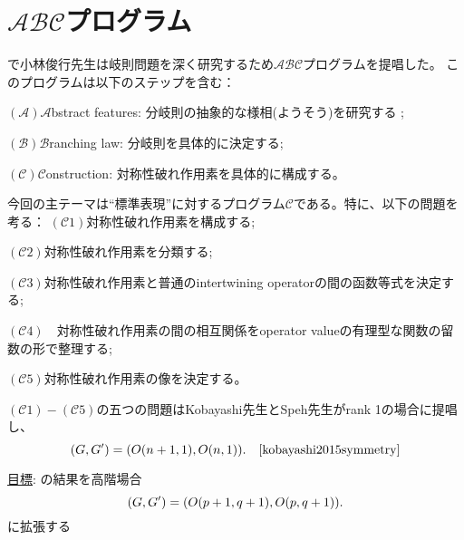 \documentclass[notes,notheorems]{beamer}
\theoremstyle{definition}
\theoremstyle{example}
\theoremstyle{remark}
\theoremstyle{mystyle}
\begin{document}
\section{$\mathcal{A}\mathcal{B}\mathcal{C}$プログラム}

\begin{frame}{}
	\quad \cite{kobayashi2015program}で小林俊行先生は岐則問題を深く研究するため$\mathcal{ABC}$プログラムを提唱した。
	このプログラムは以下のステップを含む：{
		
}\qquad$(\mathcal{A})$\quad$\mathcal{A}$bstract features: 分岐則の抽象的な様相(ようそう)を研究する
;{

}\qquad$(\mathcal{B})$\quad$\mathcal{B}$ranching law: 分岐則を具体的に決定する; {

}\qquad$(\mathcal{C})$\quad$\mathcal{C}${onstruction}: 対称性破れ作用素を具体的に構成する。
\end{frame}
\begin{frame}{}
	今回の主テーマは``標準表現''に対するプログラム$\mathcal{C}$である。特に、以下の問題を考る：
\vspace{-1em}{

}\qquad$(\mathcal{C}1)$\quad 対称性破れ作用素を構成する;{

	\vspace{-0.4em}
}\qquad$(\mathcal{C}2)$\quad 対称性破れ作用素を分類する;{

	\vspace{-0.4em}
}\qquad$(\mathcal{C}3)$\quad 対称性破れ作用素と普通のintertwining operatorの間の函数等式を決定する;{

	\vspace{-0.6em}
}\qquad$(\mathcal{C}4) \quad$対称性破れ作用素の間の相互関係をoperator valueの有理型な関数の留数の形で整理する;{

	\vspace{-0.6em}
}\qquad$(\mathcal{C}5)$\quad 対称性破れ作用素の像を決定する。{

}\vspace{-1em}\quad $(\mathcal{C}1) - (\mathcal{C}5)$の五つの問題はKobayashi先生とSpeh先生がrank 1の場合に提唱し、
\vspace{-0.6em}
\begin{equation*}
	(G, G') = (O (n + 1, 1), O (n, 1)). \quad\mbox{\cite{kobayashi2015symmetry}}
\vspace{-0.6em}
\end{equation*}
\vspace{-1.5em}
\begin{block}{\underline{目標}:}
	\cite{kobayashi2015symmetry}の結果を高階場合
\vspace{-1em}
	\begin{equation*}
		(G, G') = (O (p + 1, q + 1), O (p, q + 1)).
\vspace{-1em}
	\end{equation*}
	に拡張する
\end{block}
\end{frame}
\end{document}
